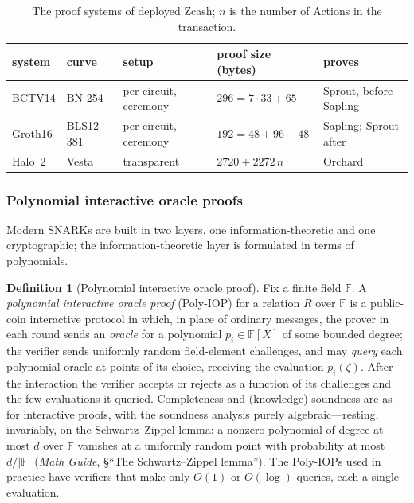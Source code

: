 \documentclass[11pt,a4paper]{article}
\theoremstyle{definition}
\newtheorem{definition}[theorem]{Definition}
\theoremstyle{remark}
\newcommand{\F}{\ensuremath{\mathbb{F}}}
\providecommand{\abs}[1]{\lvert #1 \rvert}
\begin{document}
\begin{table}[htbp]
\centering
\small
\caption{The proof systems of deployed Zcash; \(n\) is the number of
Actions in the transaction.}
\label{tab:zk-deployed}
\begin{tabular}{@{}lllll@{}}
\toprule
system & curve & setup & proof size (bytes) & proves \\
\midrule
BCTV14 & BN-254 & per circuit, ceremony & \(296 = 7 \cdot 33 + 65\)
  & Sprout, before Sapling \\
Groth16 & BLS12-381 & per circuit, ceremony & \(192 = 48 + 96 + 48\)
  & Sapling; Sprout after \\
Halo~2 & Vesta & transparent & \(2720 + 2272\,n\) & Orchard \\
\bottomrule
\end{tabular}
\end{table}

\subsubsection*{Polynomial interactive oracle proofs}

Modern SNARKs are built in two layers, one information-theoretic and
one cryptographic; the information-theoretic layer is formulated in
terms of polynomials.

\begin{definition}[Polynomial interactive oracle proof]
\label{zk:def:polyiop}
Fix a finite field \(\F\). A \emph{polynomial interactive oracle
proof} (Poly-IOP) for a relation \(R\) over \(\F\) is a public-coin
interactive protocol in which, in place of ordinary messages, the
prover in each round sends an \emph{oracle} for a polynomial
\(p_i \in \F[X]\) of some bounded degree; the verifier sends
uniformly random field-element challenges, and may \emph{query} each
polynomial oracle at points of its choice, receiving the evaluation
\(p_i(\zeta)\). After the interaction the verifier accepts or
rejects as a function of its challenges and the few evaluations it
queried. Completeness and (knowledge) soundness are as for
interactive proofs, with the soundness analysis purely
algebraic---resting, invariably, on the Schwartz--Zippel lemma: a
nonzero polynomial of degree at most \(d\) over \(\F\) vanishes at
a uniformly random point with probability at most \(d/\abs{\F}\)
(\emph{Math Guide}, \S``The Schwartz--Zippel lemma''). The Poly-IOPs
used in practice have verifiers that make only \(O(1)\) or
\(O(\log)\) queries, each a single evaluation.
\end{definition}
\end{document}
